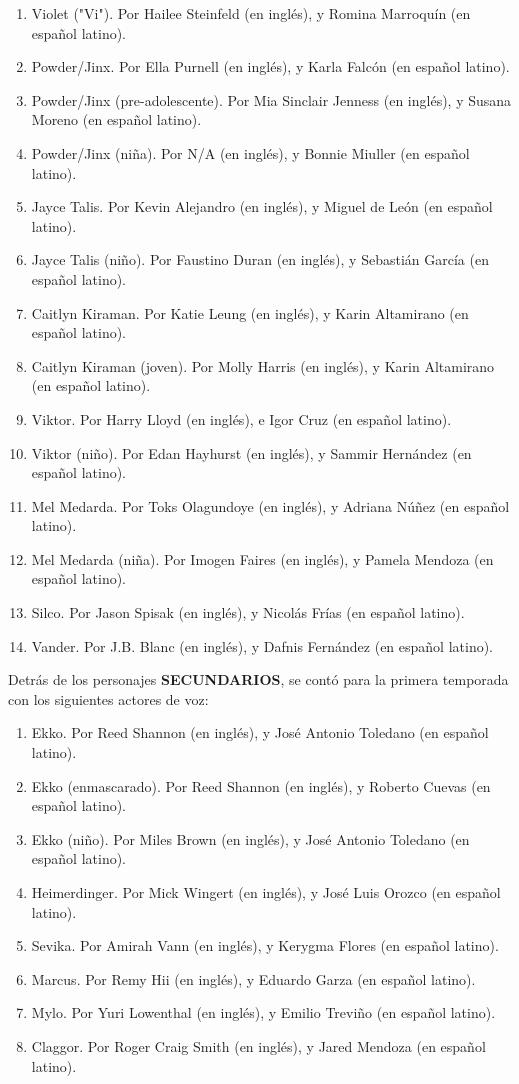 \documentclass[11pt,A5]{article}
\begin{document}
\begin{enumerate}
    \item Violet ("Vi"). Por Hailee Steinfeld (en inglés), y Romina Marroquín (en español latino).
    \item Powder/Jinx. Por Ella Purnell (en inglés), y Karla Falcón (en español latino).
    \item Powder/Jinx (pre-adolescente). Por Mia Sinclair Jenness (en inglés), y Susana Moreno (en español latino).
    \item Powder/Jinx (niña). Por N/A (en inglés), y Bonnie Miuller (en español latino).
    \item Jayce Talis. Por Kevin Alejandro (en inglés), y Miguel de León (en español latino).
    \item Jayce Talis (niño). Por Faustino Duran (en inglés), y Sebastián García (en español latino).
    \item Caitlyn Kiraman. Por Katie Leung (en inglés), y Karin Altamirano (en español latino).
    \item Caitlyn Kiraman (joven). Por Molly Harris (en inglés), y Karin Altamirano (en español latino).
    \item Viktor. Por Harry Lloyd (en inglés), e Igor Cruz (en español latino).
   \item Viktor (niño). Por Edan Hayhurst (en inglés), y Sammir Hernández (en español latino).
    \item Mel Medarda. Por Toks Olagundoye (en inglés), y Adriana Núñez (en español latino).
    \item Mel Medarda (niña). Por Imogen Faires (en inglés), y Pamela Mendoza (en español latino).
    \item Silco. Por Jason Spisak (en inglés), y Nicolás Frías (en español latino).
    \item Vander. Por J.B. Blanc (en inglés), y Dafnis Fernández (en español latino).
\end{enumerate}

Detrás de los personajes {\textbf{SECUNDARIOS}}, se contó para la primera temporada con los siguientes actores de voz:

\begin{enumerate}
    \item Ekko. Por Reed Shannon (en inglés), y José Antonio Toledano (en español latino).
    \item Ekko (enmascarado). Por Reed Shannon (en inglés), y Roberto Cuevas (en español latino).
    \item Ekko (niño). Por Miles Brown (en inglés), y José Antonio Toledano (en español latino).
    \item Heimerdinger. Por Mick Wingert (en inglés), y José Luis Orozco (en español latino).
    \item Sevika. Por Amirah Vann (en inglés), y Kerygma Flores (en español latino).
    \item Marcus. Por Remy Hii (en inglés), y Eduardo Garza (en español latino).
    \item Mylo. Por Yuri Lowenthal (en inglés), y Emilio Treviño (en español latino).
    \item Claggor. Por Roger Craig Smith (en inglés), y Jared Mendoza (en español latino).
\end{enumerate}
\end{document}
